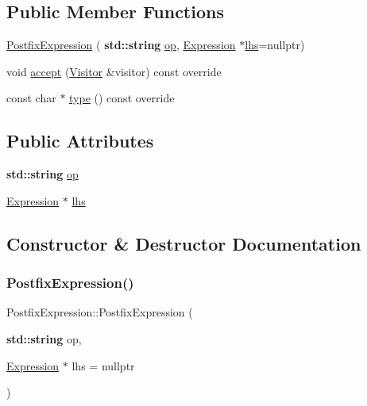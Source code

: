 \subsection*{Public Member Functions}
\begin{DoxyCompactItemize}
\item 
\hyperlink{struct_postfix_expression_a51cc535ac4af99bef2f292fb1ead6ad7}{Postfix\+Expression} (\textbf{ std\+::string} \hyperlink{struct_postfix_expression_a9ce1fb591d6787626d2eda8a9ca0a3cd}{op}, \hyperlink{struct_expression}{Expression} $\ast$\hyperlink{struct_postfix_expression_a33a5946e6ded6300ea8552325f22cba9}{lhs}=nullptr)
\item 
void \hyperlink{struct_postfix_expression_a2d814c990b7d1fb728f030a2673fe729}{accept} (\hyperlink{struct_visitor}{Visitor} \&visitor) const override
\item 
const char $\ast$ \hyperlink{struct_postfix_expression_a9971fc9b1733fa57b257a916102696fd}{type} () const override
\end{DoxyCompactItemize}
\subsection*{Public Attributes}
\begin{DoxyCompactItemize}
\item 
\textbf{ std\+::string} \hyperlink{struct_postfix_expression_a9ce1fb591d6787626d2eda8a9ca0a3cd}{op}
\item 
\hyperlink{struct_expression}{Expression} $\ast$ \hyperlink{struct_postfix_expression_a33a5946e6ded6300ea8552325f22cba9}{lhs}
\end{DoxyCompactItemize}


\subsection{Constructor \& Destructor Documentation}
\mbox{\label{struct_postfix_expression_a51cc535ac4af99bef2f292fb1ead6ad7}} 
\subsubsection{\texorpdfstring{Postfix\+Expression()}{PostfixExpression()}}
{\footnotesize\ttfamily Postfix\+Expression\+::\+Postfix\+Expression (\begin{DoxyParamCaption}\item[{\textbf{ std\+::string}}]{op,  }\item[{\hyperlink{struct_expression}{Expression} $\ast$}]{lhs = {\ttfamily nullptr} }\end{DoxyParamCaption})\hspace{0.3cm}{\ttfamily [inline]}}



